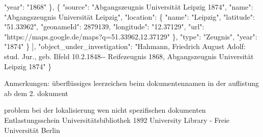 \documentclass[12pt,a4paper]{article}
\begin{document}
"{}year"{}: "{}1868"{}
\newline
\hspace*{1cm}
\},
\newline
\hspace*{1cm}
\{
\newline
\hspace*{1.5cm}
"{}source"{}: "{}Abgangszeugnis Universität Leipzig 1874"{},
\newline
\hspace*{1.5cm}
"{}name"{}: "{}Abgangszeugnis Universität Leipzig"{},
\newline
\hspace*{1.5cm}
"{}location"{}: \{
\newline
\hspace*{2cm}
"{}name"{}: "{}Leipzig"{},
\newline
\hspace*{2cm}
"{}latitude"{}: "{}51.33962"{},
\newline
\hspace*{2cm}
"{}geonameId"{}: 2879139,
\newline
\hspace*{2cm}
"{}longitude"{}: "{}12.37129"{},
\newline
\hspace*{2cm}
"{}url"{}: "{}https://maps.google.de/maps?q=51.33962,12.37129"{}
\newline
\hspace*{1.5cm}
\},
\newline
\hspace*{1.5cm}
"{}type"{}: "{}Zeugnis"{},
\newline
\hspace*{1.5cm}
"{}year"{}: "{}1874"{}
\newline
\hspace*{1cm}
\}
\newline
\hspace*{0.5cm}
],
\newline
\hspace*{0.5cm}
"{}object\_under\_investigation"{}: "{}Hahmann, Friedrich August Adolf: stud. 
\newline
\hspace*{0.5cm}
Jur., geb. Ilfeld 10.2.1848-{}- Reifezeugnis 1868, Abgangszeugnis Universität
\newline
\hspace*{0.5cm} 
Leipzig 1874"{}
\newline
\}


\newpage
Anmerkungen:
überflüssiges leerzeichen beim dokumentennamen in der auflistung ab dem 2. dokument

problem bei der lokalisierung wen nicht spezifischen dokumenten
Entlastungsschein Universitätsbibliothek 1892
University Library - Freie Universität Berlin
\end{document}

